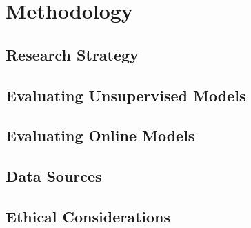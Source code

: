 \chapter{Methodology}

\section{Research Strategy}

\section{Evaluating Unsupervised Models}

\section{Evaluating Online Models}

\section{Data Sources}

\section{Ethical Considerations}